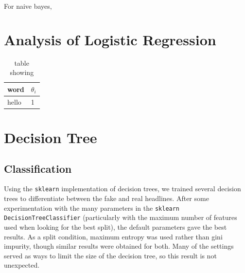 \documentclass{article}
\renewcommand{\arraystretch}{1.25}
\begin{document}
   For naive bayes,



   \section{Analysis of Logistic Regression}


   \begin{table}[h]
      \centering
      \renewcommand{\arraystretch}{1.5}

      \begin{tabular}{ p{7em}|l }
         \hline
         word     &     $\theta_i$      \\
         \hline \hline
         hello          &     1             \\
         \hline
      \end{tabular}

      \caption{ table showing }
      \label{part6table}
   \end{table}


   \section{Decision Tree}
   \subsection{Classification}
   Using the \texttt{sklearn} implementation of decision trees, we trained several decision trees
   to differentiate between the fake and real headlines. After some experimentation with the many parameters
   in the \texttt{sklearn DecisionTreeClassifier} (particularly with the maximum number of features used
   when looking for the best split), the default parameters gave the best results. As a split condition,
   maximum entropy was used rather than gini impurity, though similar results were obtained for both.
   Many of the settings served as ways to limit the size of the decision tree, so this result is not unexpected.
\end{document}
